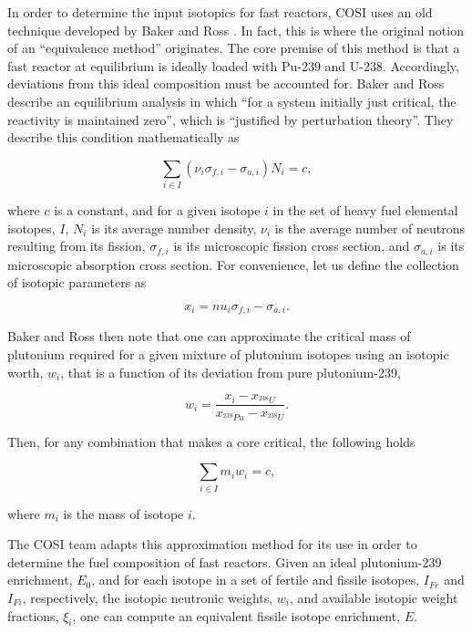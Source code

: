 In order to determine the input isotopics for fast reactors, COSI uses an old
technique developed by Baker and Ross \cite{baker_comparison_1963}. In fact,
this is where the original notion of an ``equivalence method'' originates. The
core premise of this method is that a fast reactor at equilibrium is ideally
loaded with Pu-239 and U-238. Accordingly, deviations from this ideal
composition must be accounted for. Baker and Ross describe an equilibrium
analysis in which ``for a system initially just critical, the reactivity is
maintained zero'', which is ``justified by perturbation theory''. They describe
this condition mathematically as

\begin{equation*}
\sum_{i \in I} \left( \nu_{i} \sigma_{f,i} - \sigma_{a,i} \right) N_i = c,
\end{equation*}

where $c$ is a constant, and for a given isotope $i$ in the set of heavy fuel
elemental isotopes, $I$, $N_i$ is its average number density, $\nu_{i}$ is the
average number of neutrons resulting from its fission, $\sigma_{f,i}$ is its
microscopic fission cross section, and $\sigma_{a,i}$ is its microscopic
absorption cross section. For convenience, let us define the collection of
isotopic parameters as

\begin{equation*}
x_i = nu_{i} \sigma_{f,i} - \sigma_{a,i}.
\end{equation*}

Baker and Ross then note that one can approximate the critical mass of plutonium
required for a given mixture of plutonium isotopes using an isotopic worth,
$w_i$, that is a function of its deviation from pure plutonium-239,

\begin{equation*}
w_i = \frac{x_i - x_{^{238}U}}
           {x_{^{239}Pu} - x_{^{238}U}}.
\end{equation*}

Then, for any combination that makes a core critical, the following holds

\begin{equation*}
\sum_{i \in I} m_i w_i = c,
\end{equation*}

where $m_i$ is the mass of isotope $i$.

The COSI team adapts this approximation method for its use in order to determine
the fuel composition of fast reactors. Given an ideal plutonium-239 enrichment,
$E_0$, and for each isotope in a set of fertile and fissile isotopes, $I_{Fe}$
and $I_{Fi}$, respectively, the isotopic neutronic weights, $w_i$, and available
isotopic weight fractions, $\xi_i$, one can compute an equivalent fissile
isotope enrichment, $E$.

